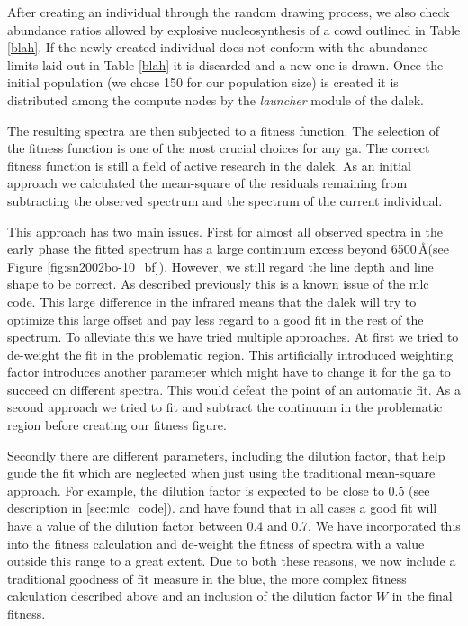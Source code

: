 After creating an individual through the random drawing process, we also check abundance ratios allowed by explosive nucleosynthesis of a \gls{cowd} outlined in Table \ref{blah}. If the newly created individual does not conform with the abundance limits laid out in Table \ref{blah} it is discarded and a new one is drawn. Once the initial population (we chose 150 for our population size) is created it is distributed among the compute nodes by the \emph{launcher} module of the \gls{dalek}.

The resulting spectra are then subjected to a fitness function. The selection of the fitness function is one of the most crucial choices for any \gls{ga}. The correct fitness function is still a field of active research in the \gls{dalek}. As an initial approach we calculated the mean-square of the residuals remaining from subtracting the observed spectrum and the spectrum of the current individual. 

This approach has two main issues. First for almost all observed spectra in the early phase the fitted spectrum has a large continuum excess beyond 6500\,\AA (see Figure \ref{fig:sn2002bo-10_bf}). However, we still regard the line depth and line shape to be correct. As described previously this is a known issue of the \gls{mlc} code. This large difference in the infrared means that the \gls{dalek} will try to optimize this large offset and pay less regard to a good fit in the rest of the spectrum. To alleviate this we have tried multiple approaches. At first we tried to de-weight the fit in the problematic region. This artificially introduced weighting factor introduces another parameter which might have to change it for the \gls{ga} to succeed on different spectra. This would defeat the point of an automatic fit. As a second approach we tried to fit and subtract the continuum in the problematic region before creating our fitness figure. 

Secondly there are different parameters, including the dilution factor, that help guide the fit which are neglected when just using the traditional mean-square approach. For example, the dilution factor is expected to be close to 0.5 (see description in \ref{sec:mlc_code}). \citet{hachinger_dipl2007} and \citet{hachinger_phd2011} have found that in all cases a good fit will have a value of the dilution factor between 0.4 and 0.7. We have incorporated this into the fitness calculation and de-weight the fitness of spectra with a value outside this range to a great extent. Due to both these reasons, we now include a traditional goodness of fit measure in the blue, the more complex fitness calculation described above and an inclusion of the dilution factor $W$ in the final fitness.

